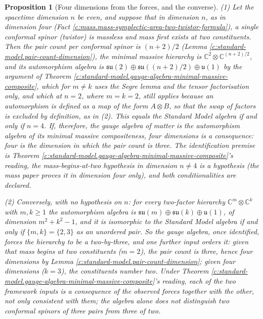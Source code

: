 \documentclass[11pt]{article}
\newtheorem{proposition}[theorem]{Proposition}
\theoremstyle{definition}
\theoremstyle{plain}
\newcommand{\changedmark}[2]{\marginpar{\raggedright\scriptsize\color{#1}#2}}
\providecommand{\C}{}\renewcommand{\C}{\mathbb{C}}
\providecommand{\su}{}\renewcommand{\su}{\mathfrak{su}}
\providecommand{\uu}{}\renewcommand{\uu}{\mathfrak{u}}
\begin{document}
\begin{proposition}[Four dimensions from the forces, and the converse]\label{c:standard-model.four-dimensions-forces-converse}
\changedmark{gray}{reworded}
(1) Let the spacetime dimension $n$ be even, and suppose that in dimension $n$, as in dimension four (Fact \ref{c:mass.mass-symplectic-area-two-twistor-formula}), a single conformal spinor (twistor) is massless and mass first exists at two constituents. Then the pair count per conformal spinor is $(n+2)/2$ (Lemma \ref{c:standard-model.pair-count-dimension}), the minimal massive hierarchy is $\C^{2} \otimes \C^{(n+2)/2}$, and its automorphism algebra is $\su(2) \oplus \su((n+2)/2) \oplus \uu(1)$ by the argument of Theorem \ref{c:standard-model.gauge-algebra-minimal-massive-composite}, which for $m \neq k$ uses the Segre lemma and the tensor factorisation only, and which at $n = 2$, where $m = k = 2$, still applies because an automorphism is defined as a map of the form $A \otimes B$, so that the swap of factors is excluded by definition, as in (2). This equals the Standard Model algebra if and only if $n = 4$. If, therefore, the gauge algebra of matter is the automorphism algebra of its minimal massive compositeness, four dimensions is a consequence: four is the dimension in which the pair count is three. The identification premise is Theorem \ref{c:standard-model.gauge-algebra-minimal-massive-composite}'s reading, the mass-begins-at-two hypothesis in dimension $n \neq 4$ is a hypothesis (the mass paper proves it in dimension four only), and both conditionalities are declared.

(2) Conversely, with no hypothesis on $n$: for every two-factor hierarchy $\C^{m} \otimes \C^{k}$ with $m, k \ge 1$ the automorphism algebra is $\su(m) \oplus \su(k) \oplus \uu(1)$, of dimension $m^{2} + k^{2} - 1$, and it is isomorphic to the Standard Model algebra if and only if $\{m, k\} = \{2, 3\}$ as an unordered pair. So the gauge algebra, once identified, forces the hierarchy to be a two-by-three, and one further input orders it: given that mass begins at two constituents ($m = 2$), the pair count is three, hence four dimensions by Lemma \ref{c:standard-model.pair-count-dimension}; given four dimensions ($k = 3$), the constituents number two. Under Theorem \ref{c:standard-model.gauge-algebra-minimal-massive-composite}'s reading, each of the two framework inputs is a consequence of the observed forces together with the other, not only consistent with them; the algebra alone does not distinguish two conformal spinors of three pairs from three of two.
\end{proposition}
\end{document}
